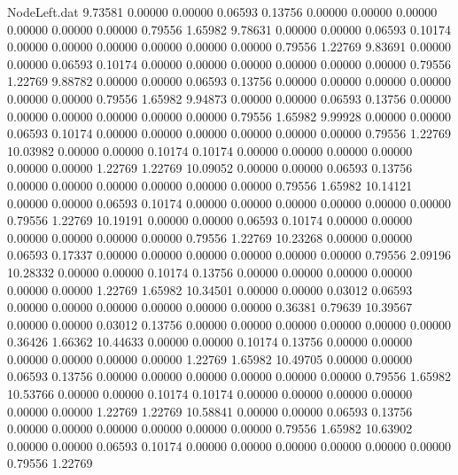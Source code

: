 \begin{filecontents}{NodeLeft.dat}
   9.73581    0.00000    0.00000     0.06593    0.13756    0.00000    0.00000    0.00000    0.00000    0.00000    0.00000    0.79556    1.65982
   9.78631    0.00000    0.00000     0.06593    0.10174    0.00000    0.00000    0.00000    0.00000    0.00000    0.00000    0.79556    1.22769
   9.83691    0.00000    0.00000     0.06593    0.10174    0.00000    0.00000    0.00000    0.00000    0.00000    0.00000    0.79556    1.22769
   9.88782    0.00000    0.00000     0.06593    0.13756    0.00000    0.00000    0.00000    0.00000    0.00000    0.00000    0.79556    1.65982
   9.94873    0.00000    0.00000     0.06593    0.13756    0.00000    0.00000    0.00000    0.00000    0.00000    0.00000    0.79556    1.65982
   9.99928    0.00000    0.00000     0.06593    0.10174    0.00000    0.00000    0.00000    0.00000    0.00000    0.00000    0.79556    1.22769
  10.03982    0.00000    0.00000     0.10174    0.10174    0.00000    0.00000    0.00000    0.00000    0.00000    0.00000    1.22769    1.22769
  10.09052    0.00000    0.00000     0.06593    0.13756    0.00000    0.00000    0.00000    0.00000    0.00000    0.00000    0.79556    1.65982
  10.14121    0.00000    0.00000     0.06593    0.10174    0.00000    0.00000    0.00000    0.00000    0.00000    0.00000    0.79556    1.22769
  10.19191    0.00000    0.00000     0.06593    0.10174    0.00000    0.00000    0.00000    0.00000    0.00000    0.00000    0.79556    1.22769
  10.23268    0.00000    0.00000     0.06593    0.17337    0.00000    0.00000    0.00000    0.00000    0.00000    0.00000    0.79556    2.09196
  10.28332    0.00000    0.00000     0.10174    0.13756    0.00000    0.00000    0.00000    0.00000    0.00000    0.00000    1.22769    1.65982
  10.34501    0.00000    0.00000     0.03012    0.06593    0.00000    0.00000    0.00000    0.00000    0.00000    0.00000    0.36381    0.79639
  10.39567    0.00000    0.00000     0.03012    0.13756    0.00000    0.00000    0.00000    0.00000    0.00000    0.00000    0.36426    1.66362
  10.44633    0.00000    0.00000     0.10174    0.13756    0.00000    0.00000    0.00000    0.00000    0.00000    0.00000    1.22769    1.65982
  10.49705    0.00000    0.00000     0.06593    0.13756    0.00000    0.00000    0.00000    0.00000    0.00000    0.00000    0.79556    1.65982
  10.53766    0.00000    0.00000     0.10174    0.10174    0.00000    0.00000    0.00000    0.00000    0.00000    0.00000    1.22769    1.22769
  10.58841    0.00000    0.00000     0.06593    0.13756    0.00000    0.00000    0.00000    0.00000    0.00000    0.00000    0.79556    1.65982
  10.63902    0.00000    0.00000     0.06593    0.10174    0.00000    0.00000    0.00000    0.00000    0.00000    0.00000    0.79556    1.22769

\end{filecontents}
